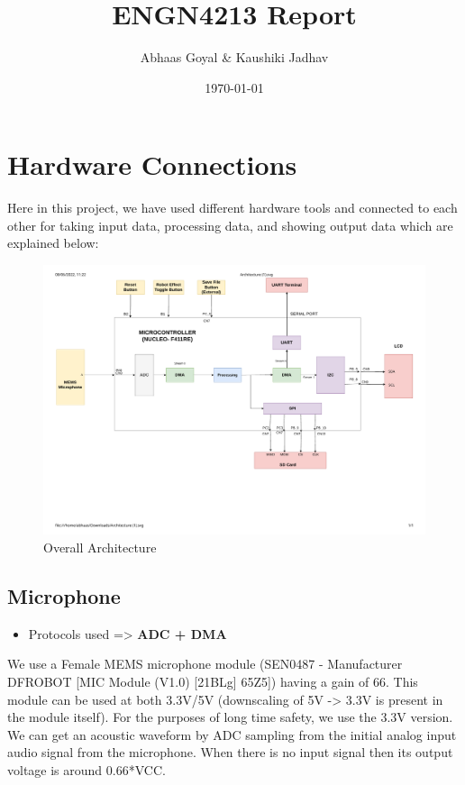 \documentclass[11pt]{article}
\author{Abhaas Goyal \& Kaushiki Jadhav}
\date{\today}
\title{ENGN4213 Report}
\begin{document}
\maketitle
\setlength\parindent{0pt}


\section{Hardware Connections}
\label{sec:orge2f46f7}
Here in this project, we have used different hardware tools and connected to each other for taking input data, processing data, and showing output data which are explained below:

\begin{figure}[H]
    \centering
    \includegraphics[width=1\textwidth, trim={0cm 5cm 0cm 1cm}, clip]{Architecture.pdf}
    \caption{Overall Architecture}
    \end{figure}

\subsection{Microphone}
\label{sec:org609154e}

\begin{itemize}
\item Protocols used => \textbf{ADC + DMA}
\end{itemize}

We use a Female MEMS microphone module (SEN0487 - Manufacturer DFROBOT [MIC Module (V1.0) [21BLg] 65Z5]) having a gain of 66. This module can be used at both 3.3V/5V (downscaling of 5V -> 3.3V is present in the module itself). For the purposes of long time safety, we use the 3.3V version. We can get an acoustic waveform by ADC sampling from the initial analog input audio signal from the microphone. When there is no input signal then its output voltage is around 0.66*VCC.
\end{document}
